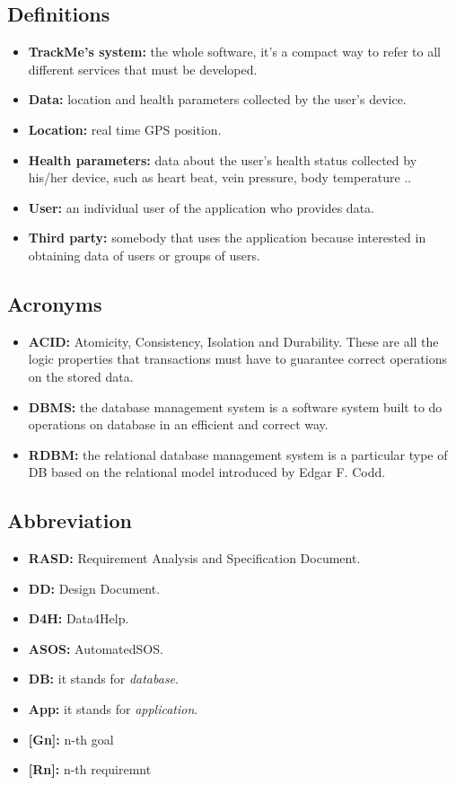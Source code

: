 \subsection{Definitions}
\begin{itemize}
	\item{\textbf{TrackMe's system:} the whole software, it's a compact way to refer to all different services that must be developed.}
	
	\item {\textbf{Data:} location and health parameters collected by the user's device.}
	\item {\textbf{Location:} real time GPS position.}
	\item {\textbf{Health parameters:} data about the user's health status collected by his/her device, such as heart beat, 	vein pressure, body temperature ..}

	\item {\textbf{User:} an individual user of the application who provides data.}
	\item {\textbf{Third party:} somebody that uses the application because interested in obtaining data of users or groups of users.}
\end{itemize}

\subsection{Acronyms} 
\begin{itemize}
	\item \textbf{ACID:} Atomicity, Consistency, Isolation and Durability. These are all the logic properties that transactions must 	have to guarantee correct operations on the stored data.
	\item \textbf{DBMS:} the database management system is a software system built to do operations on database in an efficient and correct way.
	\item \textbf{RDBM:} the relational database management system is a particular type of DB based on the relational model introduced by Edgar F. Codd.
\end{itemize}

\subsection{Abbreviation}
\begin{itemize}
	\item {\textbf {RASD:} Requirement Analysis and Specification Document.}
	\item {\textbf {DD:} Design Document.}
	\item {\textbf {D4H:} Data4Help.} 
	\item {\textbf {ASOS:} AutomatedSOS.}
	\item \textbf{DB:} it stands for \textit{database}.
	\item \textbf{App:} it stands for \textit{application}.
	\item {\textbf{[Gn]:} n-th goal}
	\item {\textbf{[Rn]:} n-th requiremnt}
\end{itemize}